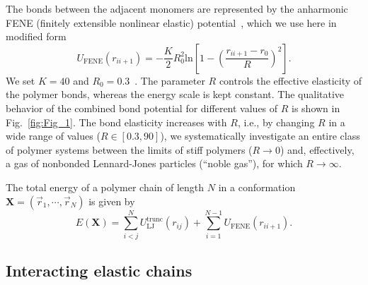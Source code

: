\documentclass[12pt]{report}
\begin{document}
The bonds between the adjacent monomers are represented by the
anharmonic FENE (finitely extensible nonlinear elastic) 
potential~\cite{BiCuArHa1987,FENE3,MilBhaBin2001}, which we use here in
modified
form
\begin{equation}
U_{\mathrm{FENE}}(r_{ii+1})=-\frac{K}{2}R_{0}^2 
\mathrm{ln}\left[1-\left(\frac{r_{ii+1}-r_0}{R}\right)^2\right]. 
\label{FENE}
\end{equation}
We set $K=40$ and $R_{0}=0.3$~\cite{Gross2013}. 
The parameter $R$ controls the effective elasticity of the polymer bonds,
whereas the energy scale is kept constant. The qualitative behavior of the
combined bond potential for different values of $R$ is shown in
Fig.~\ref{fig:Fig_1}. The bond elasticity increases with $R$,
i.e., by changing $R$ in a wide range of values
($R\in[0.3,90]$), we systematically investigate an
entire class of polymer systems between the limits of stiff polymers
($R\to 0$) and, effectively, a gas of nonbonded Lennard-Jones particles
(``noble gas''), for which $R\to \infty$.  

The total energy of a polymer chain of length $N$ in a conformation
$\mathbf{X} = (\vec{r}_1,\cdots,\vec{r}_{N})$ is given by
\begin{equation}
E(\mathbf{X}) = \sum^{N}_{i<j}
U_{\mathrm{LJ}}^{\mathrm{trunc}}(r_{ij}) + \sum^{N-1}_{i=1} 	
U_{\mathrm{FENE}}(r_{ii+1}). 
\label{totalE}
\end{equation}

\subsection{Interacting elastic chains}
\end{document}
